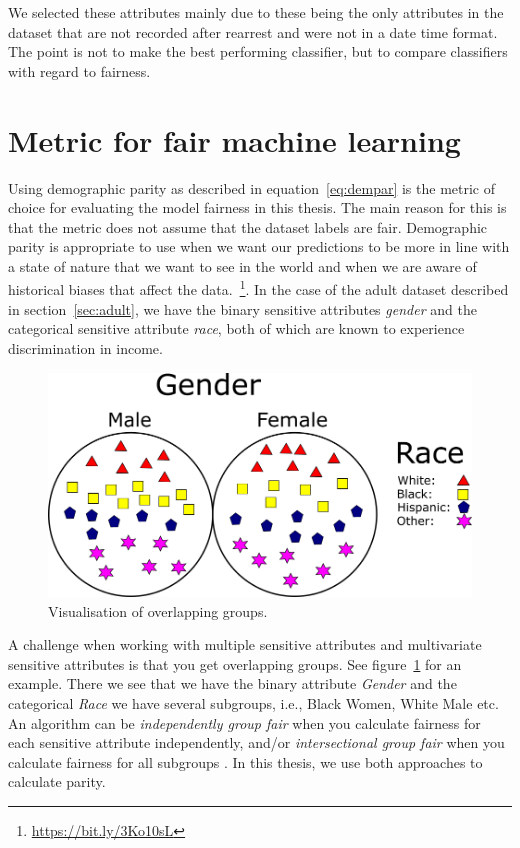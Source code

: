 We selected these attributes mainly due to these being the only attributes in the dataset that are not recorded after rearrest and were not in a date time format. The point is not to make the best performing classifier, but to compare classifiers with regard to fairness.

\section{Metric for fair machine learning}

Using demographic parity as described in equation~\ref{eq:dempar} is the metric of choice for evaluating the model fairness in this thesis. The main reason for this is that the metric does not assume that the dataset labels are fair. Demographic parity is appropriate to use when we want our predictions to be more in line with a state of nature that we want to see in the world and when we are aware of historical biases that affect the data.~\footnote{\url{https://bit.ly/3Ko10sL}}. In the case of the adult dataset described in section~\ref{sec:adult}, we have the binary sensitive attributes \emph{gender} and the categorical sensitive attribute \emph{race}, both of which are known to experience discrimination in income. 

\begin{figure}
    \centering
    \includegraphics[width=0.7\linewidth]{figures/GroupOverlap.png}
    \caption{Visualisation of overlapping groups.}
    \label{fig:overlap}
\end{figure}

A challenge when working with multiple sensitive attributes and multivariate sensitive attributes is that you get overlapping groups. See figure~\ref{fig:overlap} for an example. There we see that we have the binary attribute \emph{Gender} and the categorical \emph{Race} we have several subgroups, i.e., Black Women, White Male etc. An algorithm can be \emph{independently group fair} when you calculate fairness for each sensitive attribute independently, and/or \emph{intersectional group fair} when you calculate fairness for all subgroups \cite{Yang:2020:CoRR}. In this thesis, we use both approaches to calculate parity. 

